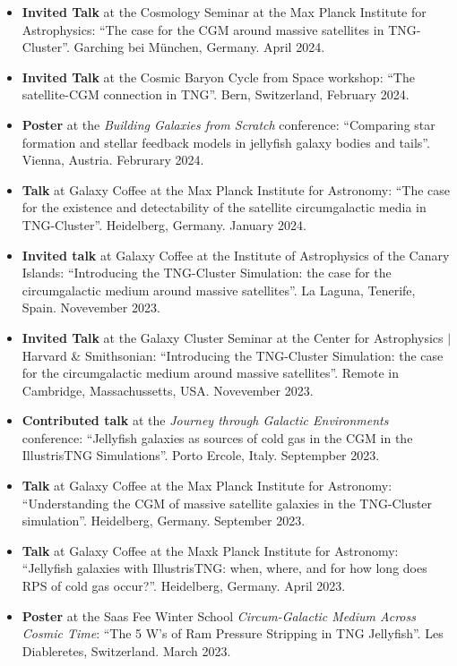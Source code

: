 \documentclass[a4paper,10pt,oneside]{article}
\begin{document}
\begin{itemize}[wide, labelwidth=!, labelindent=-11pt, parsep=0pt]
    \item {\bf Invited Talk} at the Cosmology Seminar at the Max Planck Institute for Astrophysics: ``The case for the CGM around massive satellites in TNG-Cluster''. Garching bei M{\"u}nchen, Germany. April 2024.
    \item {\bf Invited Talk} at the Cosmic Baryon Cycle from Space workshop: ``The satellite-CGM connection in TNG''. Bern, Switzerland, February 2024.
    \item {\bf Poster} at the {\it Building Galaxies from Scratch} conference: ``Comparing star formation and stellar feedback models in jellyfish galaxy bodies and tails''. Vienna, Austria. Februrary 2024.
    \item {\bf Talk} at Galaxy Coffee at the Max Planck Institute for Astronomy: ``The case for the existence and detectability of the satellite circumgalactic media in TNG-Cluster''. Heidelberg, Germany. January 2024.
    \item {\bf Invited talk} at Galaxy Coffee at the Institute of Astrophysics of the Canary Islands: ``Introducing the TNG-Cluster Simulation: the case for the circumgalactic medium around massive satellites''. La Laguna, Tenerife, Spain. Novevember 2023.
    \item {\bf Invited Talk} at the Galaxy Cluster Seminar at the Center for Astrophysics $\vert$ Harvard \& Smithsonian: ``Introducing the TNG-Cluster Simulation: the case for the circumgalactic medium around massive satellites''. Remote in Cambridge, Massachussetts, USA. Novevember 2023. 
    \item {\bf Contributed talk} at the {\it Journey through Galactic Environments} conference: ``Jellyfish galaxies as sources of cold gas in the CGM in the IllustrisTNG Simulations''. Porto Ercole, Italy. Septempber 2023.
    \item {\bf Talk} at Galaxy Coffee at the Max Planck Institute for Astronomy: ``Understanding the CGM of massive satellite galaxies in the TNG-Cluster simulation''. Heidelberg, Germany. September 2023.
    \item {\bf Talk} at Galaxy Coffee at the Maxk Planck Institute for Astronomy: ``Jellyfish galaxies with IllustrisTNG: when, where, and for how long does RPS of cold gas occur?''. Heidelberg, Germany. April 2023.
    \item {\bf Poster} at the Saas Fee Winter School {\it Circum-Galactic Medium Across Cosmic Time}: ``The 5 W's of Ram Pressure Stripping in TNG Jellyfish''. Les Diableretes, Switzerland. March 2023.

\end{itemize}
\end{document}
